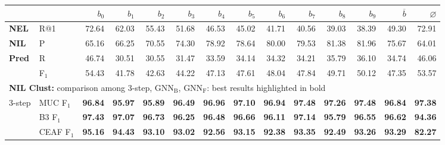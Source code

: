 \begin{landscape}
\begin{table}
    \thispagestyle{empty}
    \centering
\begin{tabular}{llrrrrrrrrrrrr}
\toprule
{} &   &  $b_0$  &     $b_1$  &     $b_2$  &     $b_3$  &     $b_4$  &     $b_5$  &     $b_6$  &     $b_7$  &     $b_8$  &     $b_9$  &     $\overline{b}$ & $\varnothing$ \\
\midrule
\textbf{NEL} & R@1          &  72.64 &  62.03 &  55.43 &  51.68 &  46.53 &  45.02 &  41.71 &  40.56 &  39.03 &  38.39 &  49.30 & 72.91 \\
\midrule
\textbf{NIL} & P            &  65.16 &  66.25 &  70.55 &  74.30 &  78.92 &  78.64 &  80.00 &  79.53 &  81.38 &  81.96 &  75.67 & 64.01 \\
\textbf{Pred} & R            &  46.74 &  30.51 &  30.55 &  31.47 &  33.59 &  34.14 &  34.32 &  34.21 &  35.79 &  36.10 &  34.74 & 46.06 \\
& F$_1$           &  54.43 &  41.78 &  42.63 &  44.22 &  47.13 &  47.61 &  48.04 &  47.84 &  49.71 &  50.12 &  47.35 & 53.57 \\
\midrule
\multicolumn{14}{l}{\textbf{NIL Clust:} comparison among 3-step, $\text{GNN}_\text{B}$, $\text{GNN}_\text{F}$: best results highlighted in bold}  \\
3-step & MUC F$_1$       &  \textbf{96.84} &  \textbf{95.97} &  \textbf{95.89} &  \textbf{96.49} &  \textbf{96.96} &  \textbf{97.10} &  \textbf{96.94} &  \textbf{97.48} &  \textbf{97.26} &  \textbf{97.48} &  \textbf{96.84} & \textbf{97.38} \\
& B3 F$_1$        &  \textbf{97.43} &  \textbf{97.07} & \textbf{96.73} &  \textbf{96.25} &  \textbf{96.48} &  \textbf{96.66} &  \textbf{96.11} &  \textbf{97.14} &  \textbf{95.79} &  \textbf{96.55} &  \textbf{96.62} & \textbf{94.36} \\
& CEAF F$_1$      &  \textbf{95.16} &  \textbf{94.43} &  \textbf{93.10} &  \textbf{93.02} &  \textbf{92.56} &  \textbf{93.15} &  \textbf{92.38} &  \textbf{93.35} &  \textbf{92.49} &  \textbf{93.26} &  \textbf{93.29} & \textbf{82.27} \\

\end{tabular}
\end{table}
\end{landscape}

